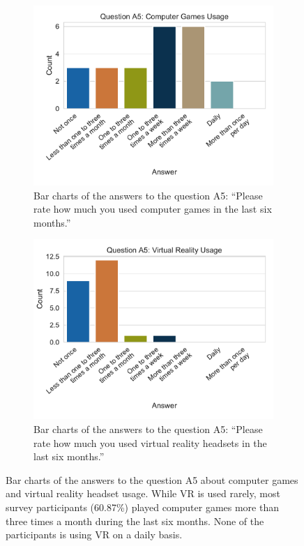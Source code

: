 \begin{figure}[H]
	\centering
	\begin{subfigure}[t]{.48\linewidth}%
		\centering
		\includegraphics[width=\linewidth]{figures/evaluation/res_demo_q8_s3.pdf}
		\caption{Bar charts of the answers to the question A5: \enquote{Please rate how much you used computer games in the last six months.}}\label{fig:res-demo-q8-s3}
	\end{subfigure}%
	\hspace{0.03\linewidth}
	\begin{subfigure}[t]{.48\linewidth}%
		\centering
		\includegraphics[width=\linewidth]{figures/evaluation/res_demo_q8_s4.pdf}
		\caption{Bar charts of the answers to the question A5: \enquote{Please rate how much you used virtual reality headsets in the last six months.}}\label{fig:res-demo-q8-s4}
	\end{subfigure}%
	\caption[Computer games and VR usage]{Bar charts of the answers to the question A5 about computer games and virtual reality headset usage. While \gls{VR} is used rarely, most survey participants (60.87\%) played computer games more than three times a month during the last six months. None of the participants is using \gls{VR} on a daily basis.}\label{fig:res-demo-q8}
\end{figure}

